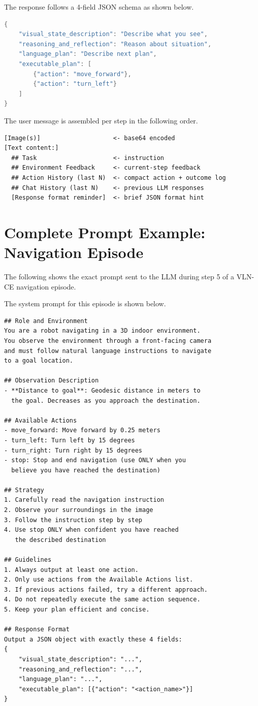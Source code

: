 The response follows a 4-field JSON schema as shown below.
\begin{lstlisting}[language=Java, basicstyle=\ttfamily\small, numbers=none]
{
    "visual_state_description": "Describe what you see",
    "reasoning_and_reflection": "Reason about situation",
    "language_plan": "Describe next plan",
    "executable_plan": [
        {"action": "move_forward"},
        {"action": "turn_left"}
    ]
}
\end{lstlisting}

The user message is assembled per step in the following order.
\begin{lstlisting}[basicstyle=\ttfamily\small, numbers=none, backgroundcolor=\color{white}, frame=single]
[Image(s)]                    <- base64 encoded
[Text content:]
  ## Task                     <- instruction
  ## Environment Feedback     <- current-step feedback
  ## Action History (last N)  <- compact action + outcome log
  ## Chat History (last N)    <- previous LLM responses
  [Response format reminder]  <- brief JSON format hint
\end{lstlisting}

\section{Complete Prompt Example: Navigation Episode}

The following shows the exact prompt sent to the LLM during step 5 of a VLN-CE navigation episode.

The system prompt for this episode is shown below.

\begin{lstlisting}[basicstyle=\ttfamily\small, numbers=none, backgroundcolor=\color{backcolour}]
## Role and Environment
You are a robot navigating in a 3D indoor environment.
You observe the environment through a front-facing camera
and must follow natural language instructions to navigate
to a goal location.

## Observation Description
- **Distance to goal**: Geodesic distance in meters to
  the goal. Decreases as you approach the destination.

## Available Actions
- move_forward: Move forward by 0.25 meters
- turn_left: Turn left by 15 degrees
- turn_right: Turn right by 15 degrees
- stop: Stop and end navigation (use ONLY when you
  believe you have reached the destination)

## Strategy
1. Carefully read the navigation instruction
2. Observe your surroundings in the image
3. Follow the instruction step by step
4. Use stop ONLY when confident you have reached
   the described destination

## Guidelines
1. Always output at least one action.
2. Only use actions from the Available Actions list.
3. If previous actions failed, try a different approach.
4. Do not repeatedly execute the same action sequence.
5. Keep your plan efficient and concise.

## Response Format
Output a JSON object with exactly these 4 fields:
{
    "visual_state_description": "...",
    "reasoning_and_reflection": "...",
    "language_plan": "...",
    "executable_plan": [{"action": "<action_name>"}]
}
\end{lstlisting}

